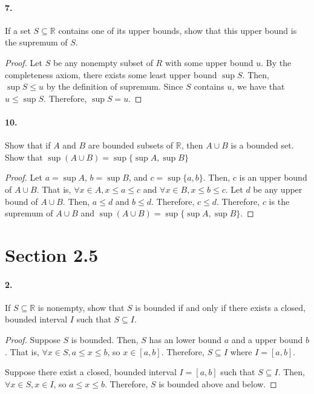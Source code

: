 \documentclass[12pt]{article}
\newcommand\R{\mathbb{R}}
\theoremstyle{remark}
\begin{document}
\paragraph{7.} If a set $S \subseteq \R$ contains one of its upper bounds, show that this upper bound is the supremum of $S$. 
\begin{proof}
    Let $S$ be any nonempty subset of $R$ with some upper bound $u$. By the completeness axiom, there exists some least upper bound $\sup S$. Then, $\sup S \leq u$ by the definition of supremum. Since $S$ contains $u$, we have that $u \leq \sup S$. Therefore, $\sup S = u$.
\end{proof}

\paragraph{10.} Show that if $A$ and $B$ are bounded subsets of $\R$, then $A \cup B$ is a bounded set. Show that $\sup(A \cup B) = \sup\{\sup A, \sup B\}$ 
\begin{proof}
    Let $a = \sup A$, $b = \sup B$, and $c = \sup\{a, b\}$. Then, $c$ is an upper bound of $A \cup B$. That is, $\forall x \in A, x \leq a \leq c$ and $\forall x \in B, x \leq b \leq c$. Let $d$ be any upper bound of $A \cup B$. Then, $a \leq d$ and $b \leq d$. Therefore, $c \leq d$. Therefore, $c$ is the supremum of $A \cup B$ and $\sup(A \cup B) = \sup\{\sup A, \sup B\}$.
\end{proof}

\section*{Section 2.5}
\paragraph{2.} If $S \subseteq \R$ is nonempty, show that $S$ is bounded if and only if there exists a closed, bounded interval $I$ such that $S \subseteq I$. 
\begin{proof}
    Suppose $S$ is bounded. Then, $S$ has an lower bound $a$ and a upper bound $b$. That is, $\forall x \in S, a \leq x \leq b$, so $x \in [a, b]$. Therefore, $S \subseteq I$ where $I = [a, b]$.

    Suppose there exist a closed, bounded interval $I = [a, b]$ such that $S \subseteq I$. Then, $\forall x \in S, x \in I$, so $a \leq x \leq b$. Therefore, $S$ is bounded above and below.
\end{proof}
\end{document}
